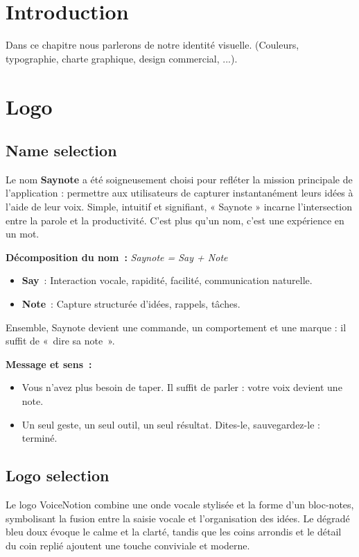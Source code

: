 
\section{Introduction}
Dans ce chapitre nous parlerons de notre identité visuelle. (Couleurs, typographie, charte graphique, design commercial, ...).

\section{Logo}
\subsection{Name selection}
\begin{tcolorbox}[colback=voicenotionLightGray!10!white, title=Origine du nom]
Le nom \textbf{Saynote} a été soigneusement choisi pour refléter la mission principale de l'application : permettre aux utilisateurs de capturer instantanément leurs idées à l’aide de leur voix. Simple, intuitif et signifiant, « Saynote » incarne l’intersection entre la parole et la productivité. C’est plus qu’un nom, c’est une expérience en un mot.
\end{tcolorbox}

\textbf{Décomposition du nom~:} \textit{Saynote = Say + Note}
\begin{itemize}
    \item \textbf{Say}~: Interaction vocale, rapidité, facilité, communication naturelle.
    \item \textbf{Note}~: Capture structurée d’idées, rappels, tâches.
\end{itemize}

\noindent
Ensemble, Saynote devient une commande, un comportement et une marque : il suffit de «~dire sa note~».

\textbf{Message et sens~:}
\begin{itemize}
    \item Vous n’avez plus besoin de taper. Il suffit de parler : votre voix devient une note.
    \item Un seul geste, un seul outil, un seul résultat. Dites-le, sauvegardez-le : terminé.
\end{itemize}

\subsection{Logo selection}
Le logo VoiceNotion combine une onde vocale stylisée et la forme d’un bloc-notes, symbolisant la fusion entre la saisie vocale et l’organisation des idées. Le dégradé bleu doux évoque le calme et la clarté, tandis que les coins arrondis et le détail du coin replié ajoutent une touche conviviale et moderne.

